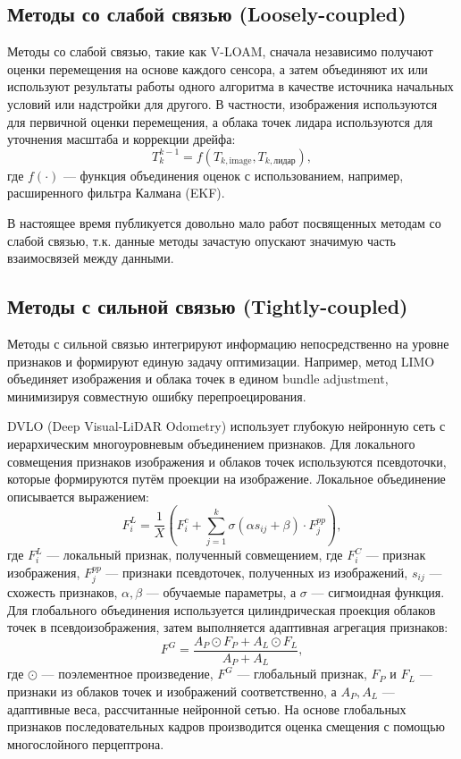 \subsection{Методы со слабой связью (Loosely-coupled)}
Методы со слабой связью, такие как V-LOAM, сначала независимо получают оценки 
перемещения на основе каждого сенсора, а затем объединяют их или используют результаты 
работы одного алгоритма в качестве источника начальных условий или надстройки для другого. 
В частности, изображения используются для первичной оценки перемещения, а облака точек лидара 
используются для уточнения масштаба и коррекции дрейфа:
\begin{equation}
T_k^{k-1} = f(T_{k,\text{image}}, T_{k,\text{лидар}}),
\end{equation}
где $f(\cdot)$ --- функция объединения оценок с использованием, например, расширенного фильтра Калмана (EKF).

В настоящее время публикуется довольно мало работ посвященных методам со слабой связью,
т.к. данные методы зачастую опускают значимую часть взаимосвязей между данными. 

\subsection{Методы с сильной связью (Tightly-coupled)}
Методы с сильной связью интегрируют информацию непосредственно на уровне признаков 
и формируют единую задачу оптимизации. Например, метод LIMO объединяет изображения 
и облака точек в едином bundle adjustment, минимизируя совместную ошибку 
перепроецирования.


DVLO (Deep Visual-LiDAR Odometry) использует глубокую нейронную сеть с 
иерархическим многоуровневым объединением признаков. Для локального совмещения 
признаков изображения и облаков точек используются псевдоточки, которые 
формируются путём проекции на изображение. Локальное объединение описывается 
выражением:
\begin{equation}
F_i^L = \frac{1}{X}\left(F_i^c + \sum_{j=1}^{k} \sigma(\alpha s_{ij} + \beta) \cdot F_j^{pp}\right),
\end{equation}
где $F_i^L$ --- локальный признак, полученный совмещением, где $F_i^C$ --- признак изображения, 
$F_j^{pp}$ --- признаки псевдоточек, полученных из изображений, $s_{ij}$ --- 
схожесть признаков, $\alpha, \beta$ --- обучаемые параметры, а $\sigma$ --- сигмоидная функция.
Для глобального объединения используется цилиндрическая проекция облаков точек 
в псевдоизображения, затем выполняется адаптивная агрегация признаков:
\begin{equation}
F^G = \frac{A_P \odot F_P + A_L \odot F_L}{A_P + A_L},
\end{equation}
где $\odot$ --- поэлементное произведение, $F^G$ --- глобальный признак, $F_P$ и $F_L$ --- признаки из облаков точек и изображений 
соответственно, а $A_P, A_L$ --- адаптивные веса, рассчитанные нейронной сетью.
На основе глобальных признаков последовательных кадров производится оценка смещения
с помощью многослойного перцептрона. 

